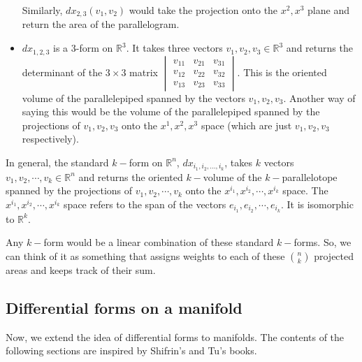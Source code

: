 \documentclass{article}
\begin{document}
\begin{itemize}
\begin{center}
\end{center}
    Similarly,  $dx_{2,3}(v_1, v_2)$ would take the projection onto the $x^2, x^3$ plane and return the area of the parallelogram. 
    \item $dx_{1,2,3}$ is a 3-form on $\mathbb{R}^3$. It takes three vectors $v_1, v_2, v_3 \in \mathbb{R}^3$ and returns the determinant of the $3\times3$ matrix
    \(
        \begin{vmatrix}        
            v_{11} & v_{21} & v_{31}\\
            v_{12} & v_{22} & v_{32}\\
            v_{13} & v_{23} & v_{33}
        \end{vmatrix}
    \). This is the oriented volume of the parallelepiped spanned by the vectors $v_1, v_2, v_3$. Another way of saying this would be the volume of the parallelepiped spanned by the projections of $v_1, v_2, v_3$ onto the $x^1, x^2, x^3$ space (which are just $v_1, v_2, v_3$ respectively).
\end{itemize}
In general, the standard  $k-$form on $\mathbb{R}^n$, $dx_{i_1, i_2, \ldots, i_k}$, takes $k$ vectors $v_1, v_2, \cdots, v_k \in \mathbb{R}^n$ and returns the oriented $k-$volume of the  $k-$parallelotope spanned by the projections of $v_1, v_2, \cdots, v_k$ onto the $x^{i_1}, x^{i_2}, \cdots, x^{i_k}$ space. The $x^{i_1}, x^{i_2}, \cdots, x^{i_k}$ space refers to the span of the vectors $e_{i_1}, e_{i_2}, \cdots, e_{i_k}$. It is isomorphic to $\mathbb{R}^k$.

Any $k-$form would be a linear combination of these standard  $k-$forms. So, we can think of it as something that assigns weights to each of these $\binom{n}{k}$ projected areas and keeps track of their sum.
\subsection{Differential forms on a manifold}
Now, we extend the idea of differential forms to manifolds. The contents of the following sections are inspired by Shifrin's \cite{shifrin2004multivariable} and Tu's \cite{tu2010introduction} books.
\end{document}
